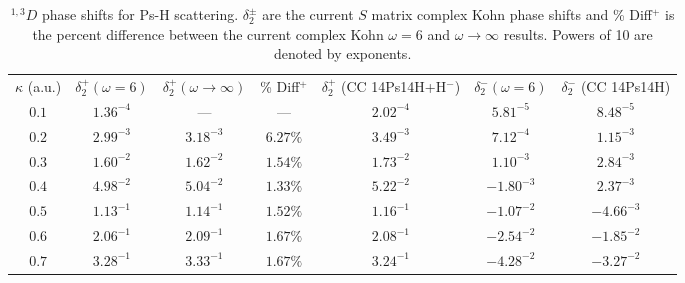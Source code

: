 \documentclass[preprint,showpacs,showkeys,preprintnumbers,amsmath,amssymb,longbibliography,pra,aps]{revtex4-1}
\begin{document}
\begin{table}
\begin{center}
\begin{ruledtabular}
\begin{tabular}{c c c c c c c}
$\kappa$ (a.u.) & $\delta_2^+ (\omega = 6)$ & $\delta_2^+ (\omega \rightarrow \infty)$ & \% Diff$^+$ & $\delta_2^+$ (CC 14Ps14H+H$^-$) \cite{Walters2004} & $\delta_2^- (\omega = 6)$ & $\delta_2^-$ (CC 14Ps14H) \cite{Blackwood2002} \\
\colrule
$0.1$ & $1.36^{-4}$ & --- & --- & $2.02^{-4}$ & $5.81^{-5}$ & $8.48^{-5}$ \\
$0.2$ & $2.99^{-3}$ & $3.18^{-3}$ & $6.27\%$ & $3.49^{-3}$ & $7.12^{-4}$ & $1.15^{-3}$ \\
$0.3$ & $1.60^{-2}$ & $1.62^{-2}$ & $1.54\%$ & $1.73^{-2}$ & $1.10^{-3}$ & $2.84^{-3}$ \\
$0.4$ & $4.98^{-2}$ & $5.04^{-2}$ & $1.33\%$ & $5.22^{-2}$ & $-1.80^{-3}$ & $2.37^{-3}$ \\
$0.5$ & $1.13^{-1}$ & $1.14^{-1}$ & $1.52\%$ & $1.16^{-1}$ & $-1.07^{-2}$ & $-4.66^{-3}$ \\
$0.6$ & $2.06^{-1}$ & $2.09^{-1}$ & $1.67\%$ & $2.08^{-1}$ & $-2.54^{-2}$ & $-1.85^{-2}$ \\
$0.7$ & $3.28^{-1}$ & $3.33^{-1}$ & $1.67\%$ & $3.24^{-1}$ & $-4.28^{-2}$ & $-3.27^{-2}$ \\
\end{tabular}
\end{ruledtabular}
\caption{$^{1,3}D$ phase shifts for Ps-H scattering. $\delta_2^\pm$ are the current
$S$ matrix complex Kohn phase shifts and \% Diff$^+$ is the percent difference
between the current complex Kohn $\omega = 6$ and $\omega \rightarrow \infty$
results. Powers of 10 are denoted by exponents.}
\label{tab:DWavePhase}
\end{center}
\end{table}
\end{document}
